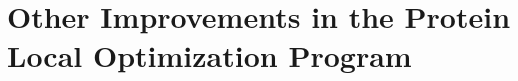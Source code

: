\chapter[PLOP Improvements]{Other Improvements in the Protein Local Optimization Program}
\label{chapter:plop_improvements}

